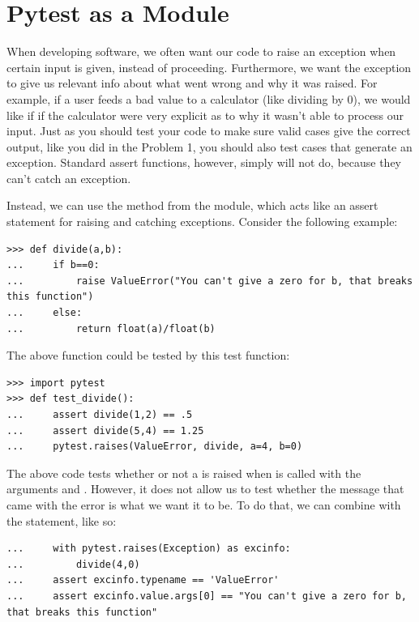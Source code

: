 \section*{Pytest as a Module}

When developing software, we often want our code to raise an exception when certain input is given, instead of proceeding.  Furthermore, we want the exception to give us relevant info about what went wrong and why it was raised.
For example, if a user feeds a bad value to a calculator (like dividing by 0), we would like if if the calculator were very explicit as to why it wasn't able to process our input.
Just as you should test your code to make sure valid cases give the correct output, like you did in the Problem 1, you should also test cases that generate an exception.  Standard assert functions, however, simply will not do, because they can't catch an exception.

Instead, we can use the  method from the  module, which acts like an assert statement for raising and catching exceptions.
Consider the following example:

\begin{lstlisting}
>>> def divide(a,b):
...     if b==0:
...         raise ValueError("You can't give a zero for b, that breaks this function")
...     else:
...         return float(a)/float(b)
\end{lstlisting}
The above function could be tested by this test function:
\begin{lstlisting}
>>> import pytest
>>> def test_divide():
...     assert divide(1,2) == .5
...     assert divide(5,4) == 1.25
...     pytest.raises(ValueError, divide, a=4, b=0)

\end{lstlisting}

The above code tests whether or not a  is raised when  is called with the arguments  and .  However, it does not allow us to test whether the message that came with the error is what we want it to be.  To do that, we can combine  with the  statement, like so:

\begin{lstlisting}
...     with pytest.raises(Exception) as excinfo:
...         divide(4,0)
...     assert excinfo.typename == 'ValueError'
...     assert excinfo.value.args[0] == "You can't give a zero for b, that breaks this function"
\end{lstlisting}

